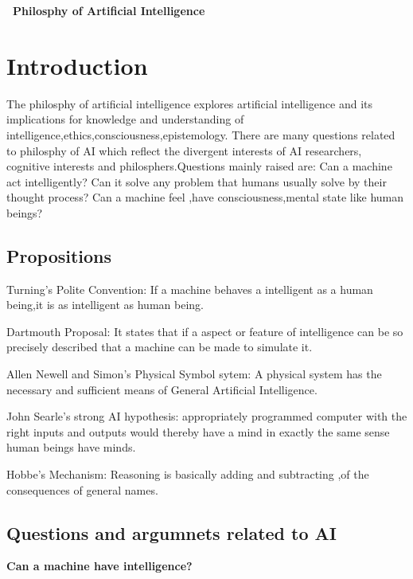 \documentclass{article}
\begin{document}
\begin{center}
\begin{large}
\textbf{ \ Philosphy of Artificial Intelligence}\\
\end{large} 

\end{center}

\section{Introduction}

The philosphy of artificial intelligence explores artificial intelligence and its implications for knowledge and understanding of intelligence,ethics,consciousness,epistemology. There are many questions related to philosphy of AI which reflect the divergent interests of AI researchers, cognitive interests and philosphers.Questions mainly raised are: Can a machine act intelligently? Can it solve any problem that humans usually solve by their thought process?  Can a machine feel ,have consciousness,mental state like human beings?
\subsection{Propositions}

Turning's Polite Convention: If a machine behaves a intelligent as a human being,it is as intelligent as human being.\par
Dartmouth Proposal: It states that if a aspect or feature of intelligence can be so precisely described that a machine can be made to simulate it.\par
Allen Newell and Simon's Physical Symbol sytem: A physical system has the necessary and sufficient means of General Artificial Intelligence.\par
John Searle's strong AI hypothesis: appropriately programmed computer with the right inputs and outputs would thereby have a mind in exactly the same sense human beings have minds.\par
Hobbe's Mechanism: Reasoning is basically adding and subtracting ,of the consequences of general names.\par

\subsection{Questions and argumnets related to AI} 
\textbf{Can a machine have intelligence?}
\end{document}
